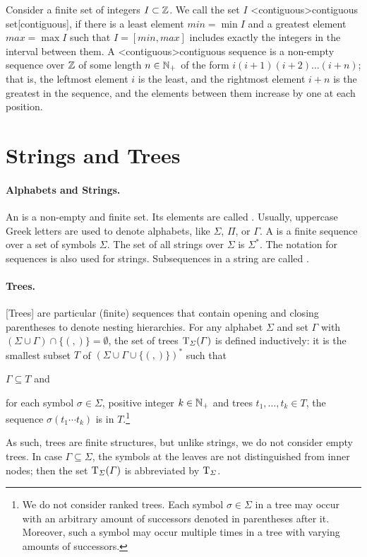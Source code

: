 \documentclass[../document.tex]{subfiles}
\begin{document}
    Consider a finite set of integers \(I \subset \mathbb{Z}\).
    We call the set \(I\) <contiguous>{contiguous set}[contiguous], if there is a least element \(\mathit{min} = \min I\) and a greatest element \(\mathit{max} = \max I\) such that \(I = [\mathit{min}, \mathit{max}]\) includes exactly the integers in the interval between them.
    A <contiguous>{contiguous sequence} is a non-empty sequence over \(\mathbb{Z}\) of some length \(n \in \mathbb{N}_+\) of the form \(i (i+1) (i+2) \ldots (i+n)\); that is, the leftmost element \(i\) is the least, and the rightmost element \(i+n\) is the greatest in the sequence, and the elements between them increase by one at each position.

    \section{Strings and Trees}\label{sec:preliminaries:trees}
    \paragraph{Alphabets and Strings.}
    An  is a non-empty and finite set. Its elements are called .
    Usually, uppercase Greek letters are used to denote alphabets, like \(\varSigma\), \(\varPi\), or \(\varGamma\).
    A  is a finite sequence over a set of symbols \(\varSigma\).
    The set of all strings over \(\varSigma\) is \(\varSigma^*\).
    The notation for sequences is also used for strings.
    Subsequences in a string are called .

    \paragraph{Trees.}
    [Trees] are particular (finite) sequences that contain opening and closing parentheses to denote nesting hierarchies.
    For any alphabet \(\varSigma\) and set \(\varGamma\) with \((\varSigma \cup \varGamma) \cap \{(,)\} = \emptyset\), the set of trees \(\operatorname{T}_\varSigma(\varGamma)\) is defined inductively: it is the smallest subset \(T\) of \((\varSigma \cup \varGamma \cup \{ (, )\})^*\) such that
    \begin{inparaenum}
        \item \(\varGamma \subseteq T\) and
        \item for each symbol \(\sigma \in \varSigma\), positive integer \(k \in \mathbb{N}_+\) and trees \(t_1, \ldots, t_k \in T\), the sequence \(\sigma(t_1 \cdots t_k)\) is in \(T\).\footnote{
            We do not consider ranked trees.
            Each symbol \(\sigma \in \varSigma\) in a tree may occur with an arbitrary amount of successors denoted in parentheses after it.
            Moreover, such a symbol may occur multiple times in a tree with varying amounts of successors.
        }
    \end{inparaenum}
    As such, trees are finite structures, but unlike strings, we do not consider empty trees.
    In case \(\varGamma \subseteq \varSigma\), the symbols at the leaves are not distinguished from inner nodes; then the set \(\operatorname{T}_\varSigma(\varGamma)\) is abbreviated by \(\operatorname{T}_\varSigma\).
\end{document}
